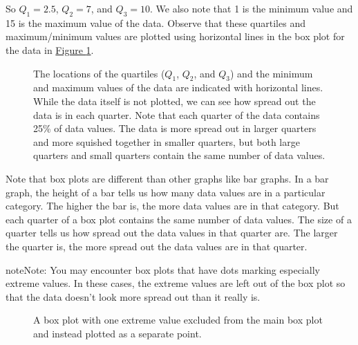 \documentclass[letterpaper,10pt,english]{jupyterBook}
\begin{document}
\sphinxAtStartPar
So \(Q_1 = 2.5\), \(Q_2 = 7\), and \(Q_3 = 10\). We also note that 1 is the minimum value and 15 is the maximum value of the data. Observe that these quartiles and maximum/minimum values are plotted using horizontal lines in the box plot for the data in \hyperref[\detokenize{Ch2 Descriptive Statistics/2.1 Measures of Position:labeled-boxplot}]{Figure \ref{\detokenize{Ch2 Descriptive Statistics/2.1 Measures of Position:labeled-boxplot}}}.

\begin{figure}[htbp]
\centering
\capstart

\noindent{}
\caption{The locations of the quartiles (\(Q_1\), \(Q_2\), and \(Q_3\)) and the minimum and maximum values of the data are indicated with horizontal lines. While the data itself is not plotted, we can see how spread out the data is in each quarter. Note that each quarter of the data contains 25\% of data values. The data is more spread out in larger quarters and more squished together in smaller quarters, but both large quarters and small quarters contain the same number of data values.}\label{\detokenize{Ch2 Descriptive Statistics/2.1 Measures of Position:labeled-boxplot}}\end{figure}

\sphinxAtStartPar
Note that box plots are different than other graphs like bar graphs. In a bar graph, the height of a bar tells us how many data values are in a particular category. The higher the bar is, the more data values are in that category. But each quarter of a box plot contains the same number of data values. The size of a quarter tells us how spread out the data values in that quarter are. The larger the quarter is, the more spread out the data values are in that quarter.

\begin{sphinxadmonition}{note}{Note:}
\sphinxAtStartPar
You may encounter box plots that have dots marking especially extreme values. In these cases, the extreme values are left out of the box plot so that the data doesn’t look more spread out than it really is.

\begin{figure}[H]
\centering
\capstart

\noindent{}
\caption{A box plot with one extreme value excluded from the main box plot and instead plotted as a separate point.}\label{\detokenize{Ch2 Descriptive Statistics/2.1 Measures of Position:outlier-boxplot}}\end{figure}
\end{sphinxadmonition}
\end{document}
